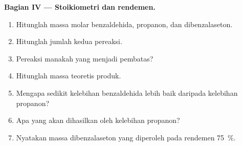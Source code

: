 \begin{problem}
\medskip
\noindent\textbf{Bagian IV --- Stoikiometri dan rendemen.}
\begin{enumerate}[resume]
  \item Hitunglah massa molar benzaldehida, propanon, dan dibenzalaseton.
  \item Hitunglah jumlah kedua pereaksi.
  \item Pereaksi manakah yang menjadi pembatas?
  \item Hitunglah massa teoretis produk.
  \item Mengapa sedikit kelebihan benzaldehida lebih baik daripada kelebihan propanon?
  \item Apa yang akan dihasilkan oleh kelebihan propanon?
  \item Nyatakan massa dibenzalaseton yang diperoleh pada rendemen 75~\%.
\end{enumerate}
\end{problem}
